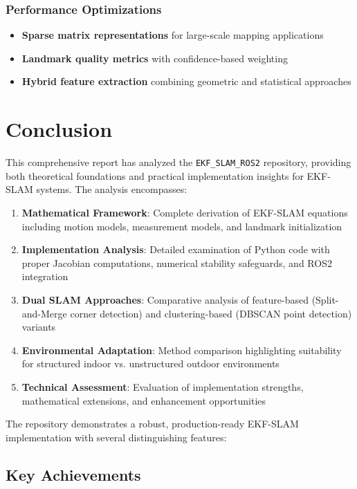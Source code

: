 \documentclass[12pt,a4paper]{article}
\begin{document}
\subsubsection{Performance Optimizations}
\begin{itemize}
    \item \textbf{Sparse matrix representations} for large-scale mapping applications
    \item \textbf{Landmark quality metrics} with confidence-based weighting
    \item \textbf{Hybrid feature extraction} combining geometric and statistical approaches
\end{itemize}

\section{Conclusion}

This comprehensive report has analyzed the \texttt{EKF\_SLAM\_ROS2} repository, providing both theoretical foundations and practical implementation insights for EKF-SLAM systems. The analysis encompasses:

\begin{enumerate}
    \item \textbf{Mathematical Framework}: Complete derivation of EKF-SLAM equations including motion models, measurement models, and landmark initialization
    \item \textbf{Implementation Analysis}: Detailed examination of Python code with proper Jacobian computations, numerical stability safeguards, and ROS2 integration
    \item \textbf{Dual SLAM Approaches}: Comparative analysis of feature-based (Split-and-Merge corner detection) and clustering-based (DBSCAN point detection) variants
    \item \textbf{Environmental Adaptation}: Method comparison highlighting suitability for structured indoor vs. unstructured outdoor environments
    \item \textbf{Technical Assessment}: Evaluation of implementation strengths, mathematical extensions, and enhancement opportunities
\end{enumerate}

The repository demonstrates a robust, production-ready EKF-SLAM implementation with several distinguishing features:

\subsection*{Key Achievements}
\end{document}
